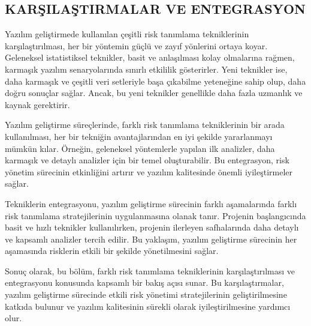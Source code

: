 \documentclass{article}
\begin{document}
\subsection{KARŞILAŞTIRMALAR VE ENTEGRASYON}

Yazılım geliştirmede kullanılan çeşitli risk tanımlama tekniklerinin karşılaştırılması, her bir yöntemin güçlü ve zayıf yönlerini ortaya koyar. Geleneksel istatistiksel teknikler, basit ve anlaşılması kolay olmalarına rağmen, karmaşık yazılım senaryolarında sınırlı etkililik gösterirler. Yeni teknikler ise, daha karmaşık ve çeşitli veri setleriyle başa çıkabilme yeteneğine sahip olup, daha doğru sonuçlar sağlar. Ancak, bu yeni teknikler genellikle daha fazla uzmanlık ve kaynak gerektirir.

Yazılım geliştirme süreçlerinde, farklı risk tanımlama tekniklerinin bir arada kullanılması, her bir tekniğin avantajlarından en iyi şekilde yararlanmayı mümkün kılar. Örneğin, geleneksel yöntemlerle yapılan ilk analizler, daha karmaşık ve detaylı analizler için bir temel oluşturabilir. Bu entegrasyon, risk yönetim sürecinin etkinliğini artırır ve yazılım kalitesinde önemli iyileştirmeler sağlar.

Tekniklerin entegrasyonu, yazılım geliştirme sürecinin farklı aşamalarında farklı risk tanımlama stratejilerinin uygulanmasına olanak tanır. Projenin başlangıcında basit ve hızlı teknikler kullanılırken, projenin ilerleyen safhalarında daha detaylı ve kapsamlı analizler tercih edilir. Bu yaklaşım, yazılım geliştirme sürecinin her aşamasında risklerin etkili bir şekilde yönetilmesini sağlar.

Sonuç olarak, bu bölüm, farklı risk tanımlama tekniklerinin karşılaştırılması ve entegrasyonu konusunda kapsamlı bir bakış açısı sunar. Bu karşılaştırmalar, yazılım geliştirme sürecinde etkili risk yönetimi stratejilerinin geliştirilmesine katkıda bulunur ve yazılım kalitesinin sürekli olarak iyileştirilmesine yardımcı olur.
\end{document}
